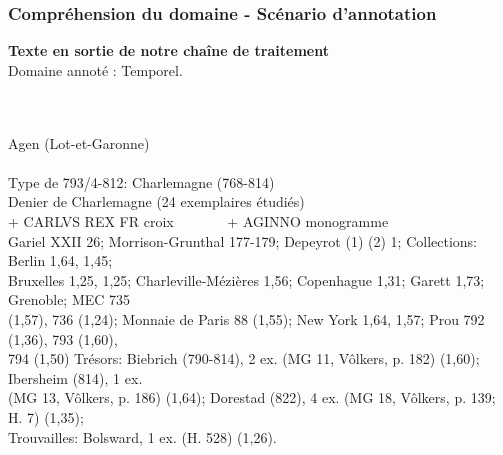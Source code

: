\documentclass[10pt, compress]{beamer}
\begin{document}
\begin{frame}[fragile]
	\frametitle{Compréhension du domaine - Scénario d'annotation}

	\textbf{Texte en sortie de notre chaîne de traitement}\\
	Domaine annoté : \colorbox{red!30}{Temporel}.\\~\\~\\
\begin{scriptsize}
Agen (Lot-et-Garonne)\\~\\

Type de \colorbox{red!30}{793/4-812}: Charlemagne (\colorbox{red!30}{768-814})\\
Denier de Charlemagne (24 exemplaires étudiés)\\
+ CARLVS REX FR croix~~~~~~~ + AGINNO monogramme\\
Gariel XXII 26; Morrison-Grunthal 177-179; Depeyrot (1) (2) 1; Collections: Berlin 1,64, 1,45;\\
Bruxelles 1,25, 1,25; Charleville-Mézières 1,56; Copenhague 1,31; Garett 1,73; Grenoble; MEC 735 \\
(1,57), 736 (1,24); Monnaie de Paris 88 (1,55); New York 1,64, 1,57; Prou 792 (1,36), 793 (1,60), \\
794 (1,50) Trésors: Biebrich (790-814), 2 ex. (MG 11, Vôlkers, p. 182) (1,60); Ibersheim (814), 1 ex. \\
(MG 13, Vôlkers, p. 186) (1,64); Dorestad (822), 4 ex. (MG 18, Vôlkers, p. 139; H. 7) (1,35);\\
Trouvailles: Bolsward, 1 ex. (H. 528) (1,26).
\end{scriptsize}
\end{frame}
\end{document}
